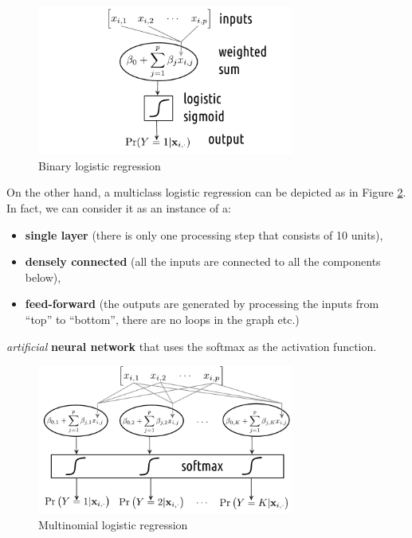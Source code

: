 \documentclass[10pt,b5paper,krantz1]{krantz}
\providecommand{\tightlist}{%
  \setlength{\itemsep}{0pt}\setlength{\parskip}{0pt}}
\begin{document}
\begin{figure}
\hypertarget{fig:logistic_regression_binary}{%
\centering
\includegraphics[width=0.75\textwidth,height=\textheight]{figures/logistic_regression_binary.pdf}
\caption{Binary logistic regression}\label{fig:logistic_regression_binary}
}
\end{figure}

On the other hand, a multiclass logistic regression can be depicted as
in Figure \ref{fig:logistic_regression_multiclass}.
In fact, we can consider it as an instance of a:

\begin{itemize}
\tightlist
\item
  \textbf{single layer} (there is only one processing step that consists of 10 units),
\item
  \textbf{densely connected} (all the inputs are connected to all the components below),
\item
  \textbf{feed-forward} (the outputs are generated by processing the inputs from ``top'' to ``bottom'', there are no loops in the graph etc.)
\end{itemize}

\emph{artificial} \textbf{neural network}
that uses the softmax as the activation function.

\begin{figure}
\hypertarget{fig:logistic_regression_multiclass}{%
\centering
\includegraphics[width=0.75\textwidth,height=\textheight]{figures/logistic_regression_multiclass.pdf}
\caption{Multinomial logistic regression}\label{fig:logistic_regression_multiclass}
}
\end{figure}
\end{document}

